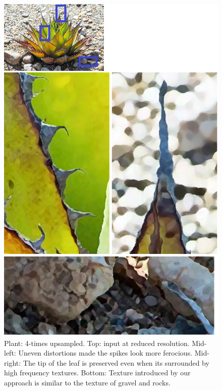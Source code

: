 \begin{figure}[htbp]\centering
\includegraphics{imagesPM/f9.png}
\caption{Plant: 4-times upsampled. Top: input at reduced resolution. Mid-left: Uneven distortions made the spikes look more ferocious. Mid-right: The tip of the leaf is preserved even when its surrounded by high frequency textures. Bottom: Texture introduced by our approach is similar to the texture of gravel and rocks.}
\label{fig:genPlant}
\end{figure}

